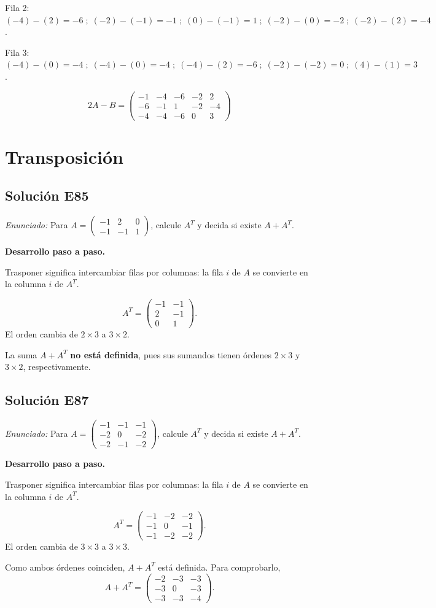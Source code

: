 \documentclass[12pt]{article}
\theoremstyle{remark}
\newcommand{\solucion}[2]{\Needspace{11\baselineskip}\subsection*{Solución E#1}\noindent\textit{Enunciado:} #2\par\medskip\noindent\textbf{Desarrollo paso a paso.}\par\medskip}
\begin{document}
Fila 2: $(-4)-(2)=-6\; ;\; (-2)-(-1)=-1\; ;\; (0)-(-1)=1\; ;\; (-2)-(0)=-2\; ;\; (-2)-(2)=-4$.

Fila 3: $(-4)-(0)=-4\; ;\; (-4)-(0)=-4\; ;\; (-4)-(2)=-6\; ;\; (-2)-(-2)=0\; ;\; (4)-(1)=3$.

\[
\boxed{2A-B=\begin{pmatrix}-1&-4&-6&-2&2\\-6&-1&1&-2&-4\\-4&-4&-6&0&3\end{pmatrix}}
\]

\medskip

\section{Transposición}

\solucion{85}{Para $A=\begin{pmatrix}-1&2&0\\-1&-1&1\end{pmatrix}$, calcule $A^T$ y decida si existe $A+A^T$.}
Trasponer significa intercambiar filas por columnas: la fila $i$ de $A$ se convierte en la columna $i$ de $A^T$.

\[
A^T=\begin{pmatrix}-1&-1\\2&-1\\0&1\end{pmatrix}.
\]
El orden cambia de $2\times3$ a $3\times2$.

La suma $A+A^T$ \textbf{no está definida}, pues sus sumandos tienen órdenes $2\times3$ y $3\times2$, respectivamente.


\medskip

\solucion{87}{Para $A=\begin{pmatrix}-1&-1&-1\\-2&0&-2\\-2&-1&-2\end{pmatrix}$, calcule $A^T$ y decida si existe $A+A^T$.}
Trasponer significa intercambiar filas por columnas: la fila $i$ de $A$ se convierte en la columna $i$ de $A^T$.

\[
A^T=\begin{pmatrix}-1&-2&-2\\-1&0&-1\\-1&-2&-2\end{pmatrix}.
\]
El orden cambia de $3\times3$ a $3\times3$.

Como ambos órdenes coinciden, $A+A^T$ está definida. Para comprobarlo,
\[
A+A^T=\begin{pmatrix}-2&-3&-3\\-3&0&-3\\-3&-3&-4\end{pmatrix}.
\]
\end{document}
